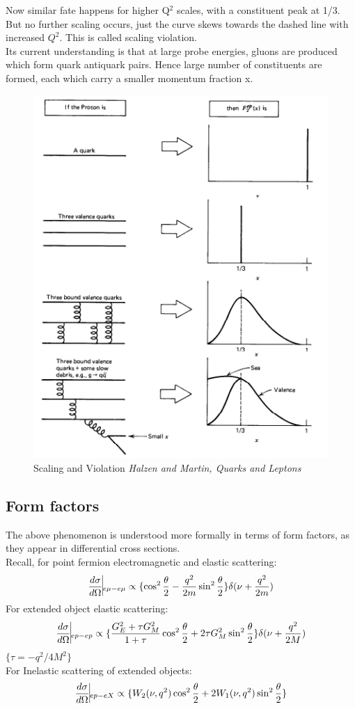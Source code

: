 \documentclass[11pt]{article}
\begin{document}
	Now similar fate happens for higher Q$^2$ scales, with a constituent peak at 1/3. But no further scaling occurs, just the curve skews towards the dashed line with increased $Q^2$. This is called scaling violation.\\
	Its current understanding is that at large probe energies, gluons are produced which form quark antiquark pairs. Hence large number of constituents are formed, each which carry a smaller momentum fraction x.
	
	\begin{figure}[h]
		\centering\includegraphics[scale=0.59]{3.png}
		\caption{\centering Scaling and Violation \textit{Halzen and Martin, Quarks and Leptons}}
		\label{fig:figure3}
	\end{figure}
	
	\subsection{Form factors}
	
	The above phenomenon is understood more formally in terms of form factors, as they appear in differential cross sections.\\
	Recall, for point fermion electromagnetic and elastic scattering:
	\[
		\frac{d\sigma}{d\Omega}\vline_{e\mu - e\mu} \propto \{\cos^2\frac{\theta}{2} - \frac{q^2}{2m} \sin^2\frac{\theta}{2}\}\delta(\nu + \frac{q^2}{2m})
	\]
	For extended object elastic scattering:
	\[
		\frac{d\sigma}{d\Omega}\vline_{ep - ep} \propto \{\frac{G_E^2 + \tau G_M^2}{1+\tau}\cos^2 \frac{\theta}{2} + 2\tau G_M^2 \sin^2\frac{\theta}{2}\}\delta(\nu + \frac{q^2}{2M})
	\]
	\(\{\tau = -q^2/ 4M^2\}\)\\
	For Inelastic scattering of extended objects:
	\[
			\frac{d\sigma}{d\Omega}\vline_{ep - eX} \propto \{W_2(\nu, q^2)\cos^2\frac{\theta}{2} + 2W_1(\nu, q^2) \sin^2\frac{\theta}{2}\}
	\]
	
\end{document}
